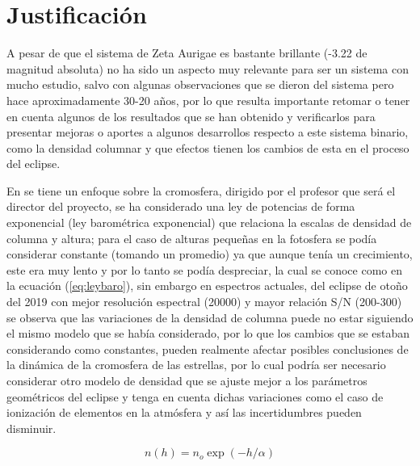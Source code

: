 \documentclass[11pt]{article}
\begin{document}
\section{Justificación}

\vspace{3mm}
A pesar de que el sistema de Zeta Aurigae es bastante brillante (-3.22 de magnitud absoluta) no ha sido un aspecto muy relevante para ser un sistema con mucho estudio, salvo con algunas observaciones que se dieron del sistema pero hace aproximadamente 30-20 años, por lo que resulta importante retomar o tener en cuenta algunos de los resultados que se han obtenido y verificarlos para presentar mejoras o aportes a algunos desarrollos respecto a este sistema binario, como la densidad columnar y que efectos tienen los cambios de esta en el proceso del eclipse.

En \cite{kps1O} se tiene un enfoque sobre la cromosfera, dirigido por el profesor que será el director del proyecto, se ha considerado una ley de potencias de forma exponencial (ley barométrica exponencial)  que relaciona la escalas de densidad de columna y altura; para el caso de alturas pequeñas en la fotosfera se podía considerar constante (tomando un promedio) ya que aunque tenía un crecimiento, este era muy lento y por lo tanto se podía despreciar, la cual se conoce como en la ecuación (\ref{eq:leybaro}), sin embargo en espectros actuales, del eclipse de otoño del 2019 con mejor resolución espectral (20000) y mayor relación S/N (200-300) se observa que las variaciones de la densidad de columna puede no estar siguiendo el mismo modelo que se había considerado, por lo que los cambios que se estaban considerando como constantes, pueden realmente afectar posibles conclusiones de la dinámica de la cromosfera de las estrellas, por lo cual podría ser necesario considerar otro modelo de densidad que se ajuste mejor a los parámetros geométricos del eclipse y tenga en cuenta dichas variaciones como el caso de ionización de elementos en la atmósfera y así las incertidumbres pueden disminuir.

\begin{equation}
    n(h) = n_o \exp{(-h/\alpha)}
    \label{eq:leybaro}
\end{equation}
\vspace{2mm}
\end{document}
